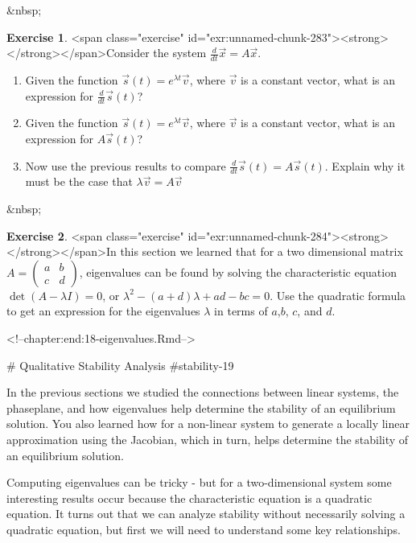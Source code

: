 \documentclass[
]{book}
\theoremstyle{definition}
\theoremstyle{definition}
\theoremstyle{definition}
\newtheorem{exercise}{Exercise}[chapter]
\theoremstyle{remark}
\begin{document}
&nbsp;

\begin{exercise}
<span class="exercise" id="exr:unnamed-chunk-283"><strong>\label{exr:unnamed-chunk-283} </strong></span>Consider the system $\displaystyle \frac{d}{dt} \vec{x} = A \vec{x}$.

\begin{enumerate}[label=\alph*.]
\item Given the function $\vec{s}(t)=e^{\lambda t} \vec{v}$, where $\vec{v}$ is a constant vector, what is an expression for $\displaystyle \frac{d}{dt} \vec{s}(t)$?
\item Given the function $\vec{s}(t)=e^{\lambda t} \vec{v}$, where $\vec{v}$ is a constant vector, what is an expression for $A \vec{s}(t)$? 
\item Now use the previous results to compare $\displaystyle \frac{d}{dt} \vec{s}(t) = A \vec{s}(t)$. Explain why it must be the case that $\lambda \vec{v} = A \vec{v}$
\end{enumerate}
\end{exercise}
&nbsp;

\begin{exercise}
<span class="exercise" id="exr:unnamed-chunk-284"><strong>\label{exr:unnamed-chunk-284} </strong></span>In this section we learned that for a two dimensional matrix $\displaystyle A = \begin{pmatrix} a & b \\ c & d \end{pmatrix}$, eigenvalues can be found by solving the characteristic equation $\det(A-\lambda I)=0$, or $\lambda^{2} - (a+d) \lambda + ad-bc = 0$.  Use the quadratic formula to get an expression for the eigenvalues $\lambda$ in terms of $a$,$b$, $c$, and $d$.
\end{exercise}





<!--chapter:end:18-eigenvalues.Rmd-->

# Qualitative Stability Analysis {#stability-19}


In the previous sections we studied the connections between linear systems, the phaseplane, and how eigenvalues help determine the stability of an equilibrium solution.  You also learned how for a non-linear system to generate a locally linear approximation using the Jacobian, which in turn, helps determine the stability of an equilibrium solution.

Computing eigenvalues can be tricky  - but for a two-dimensional system some interesting results occur because the characteristic equation is a quadratic equation.  It turns out that we can analyze stability without necessarily solving a quadratic equation, but first we will need to understand some key relationships.
\end{document}
